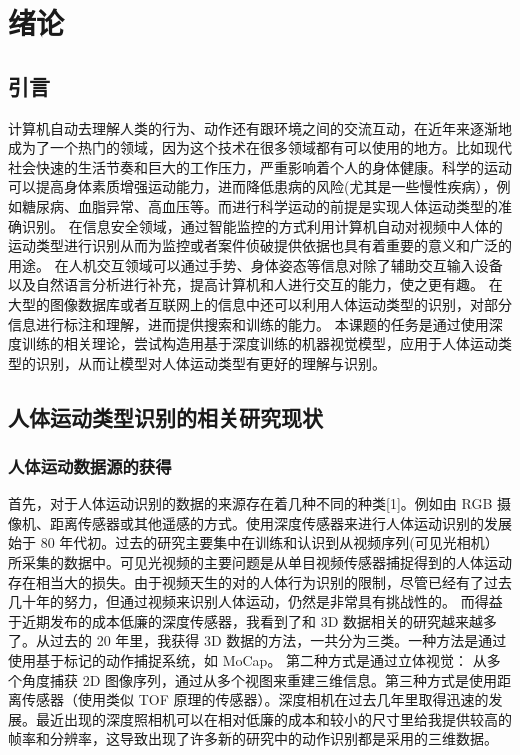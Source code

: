 \section{绪论}\label{ux7eeaux8bba}

\subsection{引言}\label{ux5f15ux8a00}

计算机自动去理解人类的行为、动作还有跟环境之间的交流互动，在近年来逐渐地成为了一个热门的领域，因为这个技术在很多领域都有可以使用的地方。比如现代社会快速的生活节奏和巨大的工作压力，严重影响着个人的身体健康。科学的运动可以提高身体素质增强运动能力，进而降低患病的风险(尤其是一些慢性疾病），例如糖尿病、血脂异常、高血压等。而进行科学运动的前提是实现人体运动类型的准确识别。
在信息安全领域，通过智能监控的方式利用计算机自动对视频中人体的运动类型进行识别从而为监控或者案件侦破提供依据也具有着重要的意义和广泛的用途。
在人机交互领域可以通过手势、身体姿态等信息对除了辅助交互输入设备以及自然语言分析进行补充，提高计算机和人进行交互的能力，使之更有趣。
在大型的图像数据库或者互联网上的信息中还可以利用人体运动类型的识别，对部分信息进行标注和理解，进而提供搜索和训练的能力。
本课题的任务是通过使用深度训练的相关理论，尝试构造用基于深度训练的机器视觉模型，应用于人体运动类型的识别，从而让模型对人体运动类型有更好的理解与识别。

\subsection{人体运动类型识别的相关研究现状}\label{ux4ebaux4f53ux8fd0ux52a8ux7c7bux578bux8bc6ux522bux7684ux76f8ux5173ux7814ux7a76ux73b0ux72b6}

\subsubsection{人体运动数据源的获得}\label{ux4ebaux4f53ux8fd0ux52a8ux6570ux636eux6e90ux7684ux83b7ux5f97}

首先，对于人体运动识别的数据的来源存在着几种不同的种类{[}1{]}。例如由
RGB
摄像机、距离传感器或其他遥感的方式。使用深度传感器来进行人体运动识别的发展始于
80
年代初。过去的研究主要集中在训练和认识到从视频序列(可见光相机）所采集的数据中。可见光视频的主要问题是从单目视频传感器捕捉得到的人体运动存在相当大的损失。由于视频天生的对的人体行为识别的限制，尽管已经有了过去几十年的努力，但通过视频来识别人体运动，仍然是非常具有挑战性的。
而得益于近期发布的成本低廉的深度传感器，我看到了和 3D
数据相关的研究越来越多了。从过去的 20 年里，我获得 3D
数据的方法，一共分为三类。一种方法是通过使用基于标记的动作捕捉系统，如
MoCap。 第二种方式是通过立体视觉： 从多个角度捕获 2D
图像序列，通过从多个视图来重建三维信息。第三种方式是使用距离传感器（使用类似
TOF
原理的传感器）。深度相机在过去几年里取得迅速的发展。最近出现的深度照相机可以在相对低廉的成本和较小的尺寸里给我提供较高的帧率和分辨率，这导致出现了许多新的研究中的动作识别都是采用的三维数据。

